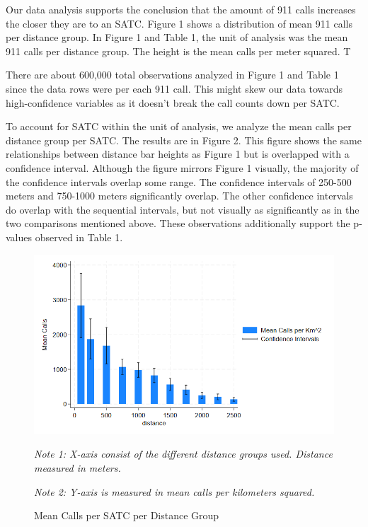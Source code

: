 \documentclass[12pt]{article}
\begin{document}
Our data analysis supports the conclusion that the amount of 911 calls increases the closer they are to an SATC. Figure 1 shows a distribution of mean 911 calls per distance group. In Figure 1 and Table 1, the unit of analysis was the mean 911 calls per distance group. The height is the mean calls per meter squared. T

There are about 600,000 total observations analyzed in Figure 1 and Table 1 since the data rows were per each 911 call. This might skew our data towards high-confidence variables as it doesn't break the call counts down per SATC. 

To account for SATC within the unit of analysis, we analyze the mean calls per distance group per SATC. The results are in Figure 2. This figure shows the same relationships between distance bar heights as Figure 1 but is overlapped with a confidence interval. Although the figure mirrors Figure 1 visually, the majority of the confidence intervals overlap some range. The confidence intervals of 250-500 meters and 750-1000 meters significantly overlap. The other confidence intervals do overlap with the sequential intervals, but not visually as significantly as in the two comparisons mentioned above. These observations additionally support the p-values observed in Table 1. 


\begin{figure}[ht]
    \centering
    \includegraphics[width=1\linewidth]{Reproducibility Package//Visual Graphics/CI_Graph.png}
    \caption{Mean Calls per SATC per Distance Group}
    \label{fig:enter-label}
    \textit{Note 1: X-axis consist of the different distance groups used. Distance measured in meters.}
    
    \textit{Note 2: Y-axis is measured in mean calls per kilometers squared.}
\end{figure}
\end{document}
